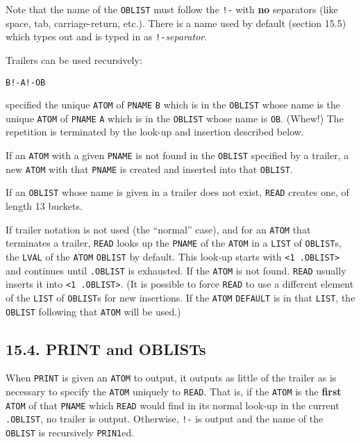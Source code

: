 \documentclass[a4paper,]{article}
\begin{document}
Note that the name of the \texttt{OBLIST} must follow the \texttt{!-} with \textbf{no} separators (like space, tab,
carriage-return, etc.). There is a name used by default (section 15.5) which types out and is typed in as
\texttt{!-}\emph{separator}.

Trailers can be used recursively:

\begin{verbatim}
B!-A!-OB
\end{verbatim}

specified the unique \texttt{ATOM} of \texttt{PNAME} \texttt{B} which is in the \texttt{OBLIST} whose name is the unique
\texttt{ATOM} of \texttt{PNAME} \texttt{A} which is in the \texttt{OBLIST} whose name is \texttt{OB}. (Whew!) The
repetition is terminated by the look-up and insertion described below.

If an \texttt{ATOM} with a given \texttt{PNAME} is not found in the \texttt{OBLIST} specified by a trailer, a new
\texttt{ATOM} with that \texttt{PNAME} is created and inserted into that \texttt{OBLIST}.

If an \texttt{OBLIST} whose name is given in a trailer does not exist, \texttt{READ} creates one, of length 13 buckets.

If trailer notation is not used (the ``normal'' case), and for an \texttt{ATOM} that terminates a trailer, \texttt{READ}
looks up the \texttt{PNAME} of the \texttt{ATOM} in a \texttt{LIST} of \texttt{OBLIST}s, the \texttt{LVAL} of the
\texttt{ATOM} \texttt{OBLIST} by default. This look-up starts with \texttt{\textless{}1\ .OBLIST\textgreater{}} and
continues until \texttt{.OBLIST} is exhausted. If the \texttt{ATOM} is not found. \texttt{READ} usually inserts it into
\texttt{\textless{}1\ .OBLIST\textgreater{}}. (It is possible to force \texttt{READ} to use a different element of the
\texttt{LIST} of \texttt{OBLIST}s for new insertions. If the \texttt{ATOM} \texttt{DEFAULT} is in
that \texttt{LIST}, the \texttt{OBLIST} following that \texttt{ATOM} will be used.)

\subsection{15.4. PRINT and OBLISTs}\label{print-and-oblists}

When \texttt{PRINT} is given an \texttt{ATOM} to output, it outputs as little of the trailer as is
necessary to specify the \texttt{ATOM} uniquely to \texttt{READ}. That is, if the \texttt{ATOM} is the \textbf{first}
\texttt{ATOM} of that \texttt{PNAME} which \texttt{READ} would find in its normal look-up in the current \texttt{.OBLIST},
no trailer is output. Otherwise, \texttt{!-} is output and the name of the \texttt{OBLIST} is recursively \texttt{PRIN1}ed.
\end{document}
